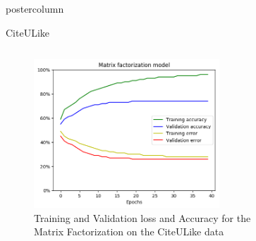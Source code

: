 \documentclass[final,hyperref={pdfpagelabels=false}]{beamer}
\begin{document}
\begin{frame}
\begin{columns}
\begin{column}{.49\paperwidth}
\begin{beamercolorbox}[center,wd=\textwidth]{postercolumn}
\begin{minipage}[T]{.99\textwidth}
{\begin{block}{CiteULike}
\begin{columns}
\begin{column}{1\textwidth}
\begin{minipage}[t]{0.96\textwidth}
\begin{columns}
 \begin{column}{0.49\textwidth}


\begin{figure}

\includegraphics[width=0.75\textwidth]{matrix.png} 
 \caption{Training and Validation loss and Accuracy for the Matrix Factorization on the CiteULike data} \label{fig:CuL_mf}
\end{figure}

 \end{column}
 \begin{column}{0.49\textwidth}

\begin{figure}


\end{figure}
\end{column}
\end{columns}
\end{minipage}
\end{column}
\end{columns}
\end{block}}
\end{minipage}
\end{beamercolorbox}
\end{column}
\end{columns}
\end{frame}
\end{document}

